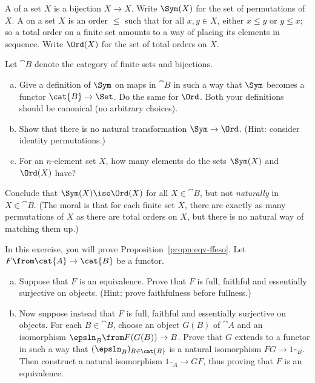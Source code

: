 \begin{question}        
\label{ex:species}
A %
%
%
of a set $X$ is a bijection $X \to X$.  Write $\Sym(X)$ for the set of
permutations of $X$.  A  on a set $X$ is an order $\leq$ such that for all $x, y \in X$,
either $x \leq y$ or $y \leq x$; so a total order on a finite set amounts
to a way of placing its elements in sequence.  Write $\Ord(X)$ for the set
of total orders on $X$.

Let $\cat{B}$ denote the category of finite sets and bijections.

\begin{enumerate}[(b)]
\item 
Give a definition of $\Sym$ on maps in $\cat{B}$ in such a way that $\Sym$
becomes a functor $\cat{B} \to \Set$.  Do the same for $\Ord$.  Both your
definitions should be canonical (no arbitrary choices).

\item 
Show that there is no natural transformation $\Sym \to \Ord$.
(Hint: consider identity permutations.)

\item 
For an $n$-element set $X$, how many elements do the sets $\Sym(X)$
and\linebreak $\Ord(X)$ have?
\end{enumerate}

Conclude that $\Sym(X) \iso \Ord(X)$ for all $X \in \cat{B}$, but not
\emph{naturally} in $X \in \cat{B}$.  (The moral is that for each finite
set $X$, there are exactly as many permutations of $X$ as there are total
orders on $X$, but there is no natural way of matching them up.)
\end{question} 


\begin{question} 
\label{ex:eqv-ffeso}
In this exercise, you will prove Proposition~\ref{propn:eqv-ffeso}.  Let $F
\from \cat{A} \to \cat{B}$ be a functor.
% 
\begin{enumerate}[(b)]
\item 
Suppose that $F$ is an equivalence.  Prove that $F$ is full, faithful and
essentially surjective on objects.  (Hint: prove faithfulness before
fullness.)

\item 
Now suppose instead that $F$ is full, faithful and essentially surjective
on objects.  For each $B \in \cat{B}$, choose an object $G(B)$ of $\cat{A}$
and an isomorphism $\epsln_B\from F(G(B)) \to B$.  Prove that $G$ extends
to a functor in such a way that $(\epsln_B)_{B \in \cat{B}}$ is a natural
isomorphism $FG \to 1_{\cat{B}}$.  Then construct a natural isomorphism
$1_{\cat{A}} \to GF$, thus proving that $F$ is an equivalence.
\end{enumerate}
\end{question}


